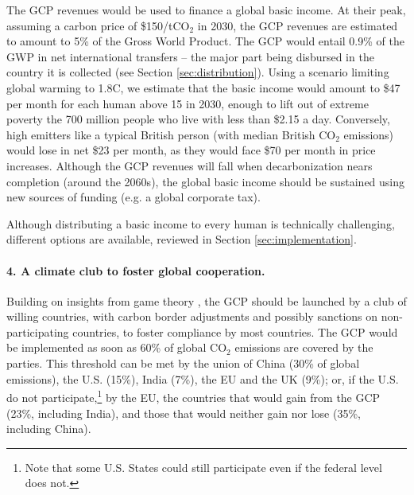 \documentclass[12pt,english]{article}
\begin{document}
The GCP revenues would be used to finance a global basic income. At their peak, assuming a carbon price of \$150/tCO$_\text{2}$ in 2030, the GCP revenues are estimated to amount to 5\% of the Gross World Product. The GCP would entail 0.9\% of the GWP in net international transfers -- the major part being disbursed in the country it is collected (see Section \ref{sec:distribution}). %
Using a scenario limiting global warming to 1.8\textdegree{}C,%
we estimate that the basic income would amount to \$47 per month for each human above 15 in 2030, enough to lift out of extreme poverty the 700 million people who live with less than \$2.15 a day. Conversely, high emitters like a typical British person (with median British CO$_\text{2}$ emissions) would lose in net \$23 per month, as they would face \$70 per month in price increases. %
Although the GCP revenues will fall when decarbonization nears completion (around the 2060s), the global basic income should be sustained using new sources of funding (e.g. a global corporate tax). 

Although distributing a basic income to every human is technically challenging, different options are available, reviewed in Section \ref{sec:implementation}. 

\paragraph*{4. A climate club to foster global cooperation.}

Building on insights from game theory \citep{mackay_price_2015, nordhaus_climate_2015}, the GCP should be launched by a club of willing countries, with carbon border adjustments and possibly sanctions on non-participating countries, to foster compliance by most countries. 
The GCP would be implemented as soon as 60\% of global CO$_\text{2}$ emissions are covered by the parties. This threshold can be met by the union of China (30\% of global emissions), the U.S. (15\%), India (7\%), the EU and the UK (9\%); or, if the U.S. do not participate,\footnote{Note that some U.S. States could still participate even if the federal level does not.} by the EU, the countries that would gain from the GCP (23\%, including India), and those that would neither gain nor lose (35\%, including China).
\end{document}
